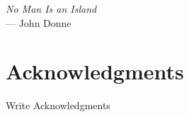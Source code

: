 
\begin{flushright}{\slshape    
No Man Is an Island} \\ \medskip
    --- John Donne
\end{flushright}



\bigskip

\begingroup
\let\clearpage\relax
\let\cleardoublepage\relax
\let\cleardoublepage\relax
\chapter*{Acknowledgments}
 
Write Acknowledgments

\endgroup



